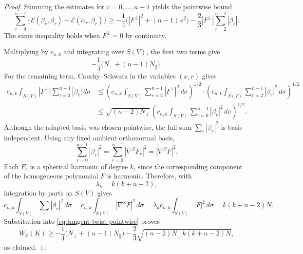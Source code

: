 \documentclass[10pt,a4paper]{amsart}
\newcommand{\cE}{\mathcal E}
\begin{document}
\begin{proof}
Summing the estimates for $r=0,\ldots,n-1$ yields the pointwise bound
\begin{equation}\label{eq:tangent-twist-pointwise}
  \sum_{r=0}^{n-1}
  \bigl\{\cE(\beta_r,\beta_r)-\cE(\alpha_r,\beta_r)\bigr\}
  \geq
  -\frac14\bigl(|F^\perp|^2+(n-1)\phi^2\bigr)
  -\frac23|F^\perp|
     \sum_{r=2}^{n-1}|\beta_r|.
\end{equation}
The same inequality holds when $F^\perp=0$ by continuity.

Multiplying by $c_{n,k}$ and integrating over $S(V)$, the first two
terms give
$$
  -\frac14\bigl(N_{\perp}+(n-1)N_{\parallel}\bigr).
$$
For the remaining term, Cauchy--Schwarz in the variables $(x,r)$ gives
\begin{align*}
  c_{n,k}\int_{S(V)}
  |F^\perp|\sum_{r=2}^{n-1}|\beta_r|\,d\sigma
  &\leq
  \left(
    c_{n,k}\int_{S(V)}
    \sum_{r=2}^{n-1}|F^\perp|^2\,d\sigma
  \right)^{1/2}\cdot
  \left(
    c_{n,k}\int_{S(V)}
    \sum_{r=2}^{n-1}|\beta_r|^2\,d\sigma
  \right)^{1/2}                                      \\
  &\leq
  \sqrt{(n-2)N_{\perp}}\,
  \left(
    c_{n,k}\int_{S(V)}
    \sum_{r=0}^{n-1}|\beta_r|^2\,d\sigma
  \right)^{1/2}.
\end{align*}
Although the adapted basis was chosen pointwise, the full sum
$\sum_r|\beta_r|^2$ is basis-independent. Using any fixed ambient
orthonormal basis,
$$
  \sum_{r=0}^{n-1}|\beta_r|^2
  =\sum_{r=0}^{n-1}|\nabla^S F_r|^2
  =|\nabla^S F|^2.
$$
Each $F_r$ is a spherical harmonic of degree $k$, since the corresponding
component of the homogeneous polynomial $F$ is harmonic. Therefore, with
$$
  \lambda_k=k(k+n-2),
$$
integration by parts on $S(V)$ gives
$$
  c_{n,k}\int_{S(V)}\sum_r|\beta_r|^2\,d\sigma
  =
  c_{n,k}\int_{S(V)}|\nabla^S F|^2\,d\sigma
  =
  \lambda_k c_{n,k}\int_{S(V)}|F|^2\,d\sigma
  =
  k(k+n-2)N.
$$
Substitution into \eqref{eq:tangent-twist-pointwise} proves
$$
  W_{\cE}(K)
  \geq-\frac14\bigl(N_{\perp}+(n-1)N_{\parallel}\bigr)
  -\frac23
   \sqrt{(n-2)N_{\perp}\,k(k+n-2)N},
$$
as claimed.
\end{proof}
\end{document}
